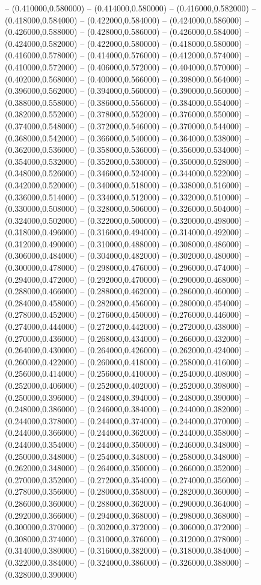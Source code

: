 -- (0.410000,0.580000) -- (0.414000,0.580000) -- (0.416000,0.582000) -- (0.418000,0.584000) -- (0.422000,0.584000) -- (0.424000,0.586000) -- (0.426000,0.588000) -- (0.428000,0.586000) -- (0.426000,0.584000) -- (0.424000,0.582000) -- (0.422000,0.580000) -- (0.418000,0.580000) -- (0.416000,0.578000) -- (0.414000,0.576000) -- (0.412000,0.574000) -- (0.410000,0.572000) -- (0.406000,0.572000) -- (0.404000,0.570000) -- (0.402000,0.568000) -- (0.400000,0.566000) -- (0.398000,0.564000) -- (0.396000,0.562000) -- (0.394000,0.560000) -- (0.390000,0.560000) -- (0.388000,0.558000) -- (0.386000,0.556000) -- (0.384000,0.554000) -- (0.382000,0.552000) -- (0.378000,0.552000) -- (0.376000,0.550000) -- (0.374000,0.548000) -- (0.372000,0.546000) -- (0.370000,0.544000) -- (0.368000,0.542000) -- (0.366000,0.540000) -- (0.364000,0.538000) -- (0.362000,0.536000) -- (0.358000,0.536000) -- (0.356000,0.534000) -- (0.354000,0.532000) -- (0.352000,0.530000) -- (0.350000,0.528000) -- (0.348000,0.526000) -- (0.346000,0.524000) -- (0.344000,0.522000) -- (0.342000,0.520000) -- (0.340000,0.518000) -- (0.338000,0.516000) -- (0.336000,0.514000) -- (0.334000,0.512000) -- (0.332000,0.510000) -- (0.330000,0.508000) -- (0.328000,0.506000) -- (0.326000,0.504000) -- (0.324000,0.502000) -- (0.322000,0.500000) -- (0.320000,0.498000) -- (0.318000,0.496000) -- (0.316000,0.494000) -- (0.314000,0.492000) -- (0.312000,0.490000) -- (0.310000,0.488000) -- (0.308000,0.486000) -- (0.306000,0.484000) -- (0.304000,0.482000) -- (0.302000,0.480000) -- (0.300000,0.478000) -- (0.298000,0.476000) -- (0.296000,0.474000) -- (0.294000,0.472000) -- (0.292000,0.470000) -- (0.290000,0.468000) -- (0.288000,0.466000) -- (0.288000,0.462000) -- (0.286000,0.460000) -- (0.284000,0.458000) -- (0.282000,0.456000) -- (0.280000,0.454000) -- (0.278000,0.452000) -- (0.276000,0.450000) -- (0.276000,0.446000) -- (0.274000,0.444000) -- (0.272000,0.442000) -- (0.272000,0.438000) -- (0.270000,0.436000) -- (0.268000,0.434000) -- (0.266000,0.432000) -- (0.264000,0.430000) -- (0.264000,0.426000) -- (0.262000,0.424000) -- (0.260000,0.422000) -- (0.260000,0.418000) -- (0.258000,0.416000) -- (0.256000,0.414000) -- (0.256000,0.410000) -- (0.254000,0.408000) -- (0.252000,0.406000) -- (0.252000,0.402000) -- (0.252000,0.398000) -- (0.250000,0.396000) -- (0.248000,0.394000) -- (0.248000,0.390000) -- (0.248000,0.386000) -- (0.246000,0.384000) -- (0.244000,0.382000) -- (0.244000,0.378000) -- (0.244000,0.374000) -- (0.244000,0.370000) -- (0.244000,0.366000) -- (0.244000,0.362000) -- (0.244000,0.358000) -- (0.244000,0.354000) -- (0.244000,0.350000) -- (0.246000,0.348000) -- (0.250000,0.348000) -- (0.254000,0.348000) -- (0.258000,0.348000) -- (0.262000,0.348000) -- (0.264000,0.350000) -- (0.266000,0.352000) -- (0.270000,0.352000) -- (0.272000,0.354000) -- (0.274000,0.356000) -- (0.278000,0.356000) -- (0.280000,0.358000) -- (0.282000,0.360000) -- (0.286000,0.360000) -- (0.288000,0.362000) -- (0.290000,0.364000) -- (0.292000,0.366000) -- (0.294000,0.368000) -- (0.298000,0.368000) -- (0.300000,0.370000) -- (0.302000,0.372000) -- (0.306000,0.372000) -- (0.308000,0.374000) -- (0.310000,0.376000) -- (0.312000,0.378000) -- (0.314000,0.380000) -- (0.316000,0.382000) -- (0.318000,0.384000) -- (0.322000,0.384000) -- (0.324000,0.386000) -- (0.326000,0.388000) -- (0.328000,0.390000) 